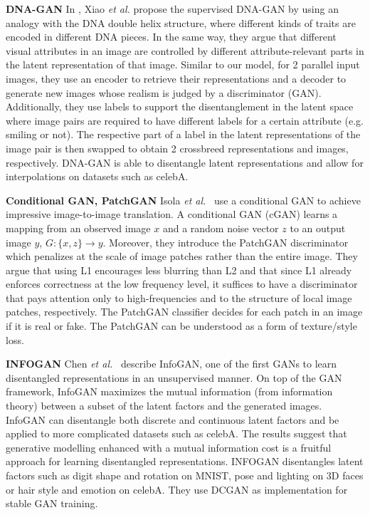 \documentclass[12pt,a4paper]{article}
\begin{document}
\par \textbf{DNA-GAN} In \cite{DnaGan}, Xiao \textit{et al.} propose the supervised DNA-GAN by using an analogy with the DNA double helix structure, where different kinds of traits are encoded in different DNA pieces. In the same way, they argue that different visual attributes in an image are controlled by different attribute-relevant parts in the latent representation of that image. Similar to our model, for 2 parallel input images, they use an encoder to retrieve their representations and a decoder to generate new images whose realism is judged by a discriminator (GAN). Additionally, they use labels to support the disentanglement in the latent space where image pairs are required to have different labels for a certain attribute (e.g. smiling or not). The respective part of a label in the latent representations of the image pair is then swapped to obtain 2 crossbreed representations and images, respectively. DNA-GAN is able to disentangle latent representations and allow for interpolations on datasets such as celebA.

\par \textbf{Conditional GAN, PatchGAN} Isola \textit{et al.}~\cite{CondGAN_PatchGAN} use a conditional GAN to achieve impressive image-to-image translation. A conditional GAN (cGAN) learns a mapping from an observed image $x$ and a random noise vector $z$ to an output image $y$, $G : \{x,z\} \rightarrow y$. Moreover, they introduce the PatchGAN discriminator which penalizes at the scale of image patches rather than the entire image. They argue that using L1 encourages less blurring than L2 and that since L1 already enforces correctness at the low frequency level, it suffices to have a discriminator that pays attention only to high-frequencies and to the structure of local image patches, respectively. The PatchGAN classifier decides for each patch in an image if it is real or fake. The PatchGAN can be understood as a form of texture/style loss.

\par\textbf{INFOGAN} Chen \textit{et al.}~\cite{InfoGAN} describe InfoGAN, one of the first GANs to learn disentangled representations in an unsupervised manner. On top of the GAN framework, InfoGAN maximizes the mutual information (from information theory) between a subset of the latent factors and the generated images. InfoGAN can disentangle both discrete and continuous latent factors and be applied to more complicated datasets such as celebA. The results suggest that generative modelling enhanced with a mutual information cost is a fruitful approach for learning disentangled representations. INFOGAN disentangles latent factors such as digit shape and rotation on MNIST, pose and lighting on 3D faces or hair style and emotion on celebA. They use DCGAN as implementation for stable GAN training. 
\end{document}
